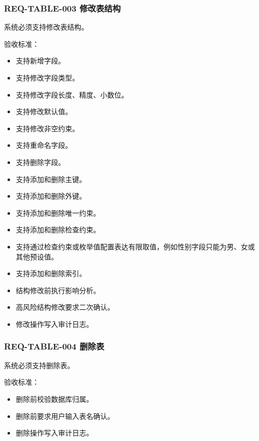 \documentclass[
  a4paper,
  UTF8]{ctexart}
\providecommand{\tightlist}{%
  \setlength{\itemsep}{0pt}\setlength{\parskip}{0pt}}
\begin{document}
\hypertarget{req-table-003-ux4feeux6539ux8868ux7ed3ux6784}{%
\subsubsection{REQ-TABLE-003
修改表结构}\label{req-table-003-ux4feeux6539ux8868ux7ed3ux6784}}

系统必须支持修改表结构。

验收标准：

\begin{itemize}
\tightlist
\item
  支持新增字段。
\item
  支持修改字段类型。
\item
  支持修改字段长度、精度、小数位。
\item
  支持修改默认值。
\item
  支持修改非空约束。
\item
  支持重命名字段。
\item
  支持删除字段。
\item
  支持添加和删除主键。
\item
  支持添加和删除外键。
\item
  支持添加和删除唯一约束。
\item
  支持添加和删除检查约束。
\item
  支持通过检查约束或枚举值配置表达有限取值，例如性别字段只能为男、女或其他预设值。
\item
  支持添加和删除索引。
\item
  结构修改前执行影响分析。
\item
  高风险结构修改要求二次确认。
\item
  修改操作写入审计日志。
\end{itemize}

\hypertarget{req-table-004-ux5220ux9664ux8868}{%
\subsubsection{REQ-TABLE-004
删除表}\label{req-table-004-ux5220ux9664ux8868}}

系统必须支持删除表。

验收标准：

\begin{itemize}
\tightlist
\item
  删除前校验数据库归属。
\item
  删除前要求用户输入表名确认。
\item
  删除操作写入审计日志。
\end{itemize}
\end{document}
